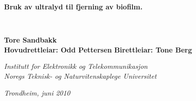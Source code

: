 \thispagestyle{empty}
\begin{center}
 
  \vspace{25mm}
  
  \LARGE
  \textbf{Bruk av ultralyd til fjerning av biofilm.} \\
  
  \vspace{5mm}
  
  \textbf{} \\
  \vspace{5mm}
  
  \normalsize
  \textbf{Tore Sandbakk} \\
  \textbf{Hovudrettleiar: Odd Pettersen}
  \textbf{Birettleiar: Tone Berg}\\
  
  \vspace{30mm}
  
  \Large
  
  \vspace{20mm}
  
  \textsl{Institutt for Elektronikk og Telekommunikasjon} \\
  \textsl{Noregs Teknisk- og Naturvitenskaplege Universitet} \\
  
  \vspace{10mm}
  
  \large
  \textsl{Trondheim, juni 2010} \\
\end{center}